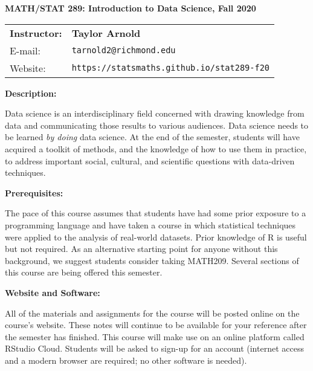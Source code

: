 \documentclass[12pt, a4paper]{article}
\begin{document}
\begin{center}
\textbf{MATH/STAT 289: Introduction to Data Science, Fall 2020}
\end{center}

\noindent
\begin{tabular}{ l l }
\textbf{Instructor:} &  \textbf{Taylor Arnold} \\
E-mail: & \texttt{tarnold2@richmond.edu} \\
Website: & \texttt{https://statsmaths.github.io/stat289-f20}
\end{tabular}

\vspace{0.5cm}

\textbf{Description:} \vspace{6pt}

Data science is an interdisciplinary field concerned with drawing knowledge
from data and communicating those results to various audiences. Data
science needs to be learned \textit{by doing} data science. At the end of the semester,
students will have acquired a toolkit of methods, and the knowledge of how to
use them in practice, to address important social, cultural, and scientific
questions with data-driven techniques.

\bigskip

\textbf{Prerequisites:} \vspace{6pt}

The pace of this course assumes that students have had some prior exposure to a programming
language and have taken a course in which statistical techniques were applied to the
analysis of real-world datasets. Prior knowledge of R is useful but not required. As an
alternative starting point for anyone without this background, we suggest students consider
taking MATH209. Several sections of this course are being offered this semester.

\bigskip

\textbf{Website and Software:} \vspace{6pt}

All of the materials and assignments for the course will be posted online on the course's
website. These notes will continue to be available for your reference after the semester has
finished. This course will make use on an online platform called RStudio Cloud. Students
will be asked to sign-up for an account (internet access and a modern browser are required;
no other software is needed).

\bigskip
\end{document}
